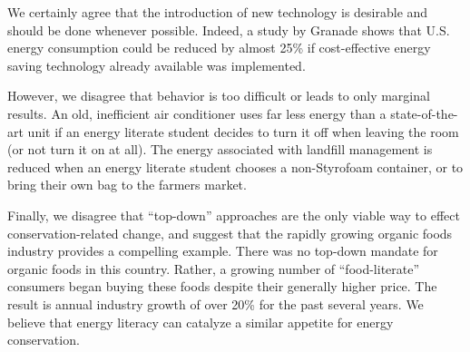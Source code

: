 \documentclass[11pt]{article}
\begin{document}
We certainly agree that the introduction of new technology is desirable and
should be done whenever possible.  Indeed, a study by Granade \cite{Granade09}
shows that U.S. energy consumption could be reduced by almost 25\% if
cost-effective energy saving technology already available was implemented.

However, we disagree that behavior is too difficult or leads to only
marginal results.  An old, inefficient air conditioner uses far less energy
than a state-of-the-art unit if an energy literate student decides to turn
it off when leaving the room (or not turn it on at all).  The energy associated with landfill
management is reduced when an energy literate student chooses a
non-Styrofoam container, or to bring their own bag to the farmers market.

Finally, we disagree that ``top-down'' approaches are the only viable way
to effect conservation-related change, and suggest that the rapidly growing
organic foods industry provides a compelling example.  There was no
top-down mandate for organic foods in this country. Rather, a growing
number of ``food-literate'' consumers began buying these foods despite
their generally higher price.  The result is annual industry growth of over
20\% for the past several years.  We believe that energy literacy can
catalyze a similar appetite for energy conservation.




\end{document}
